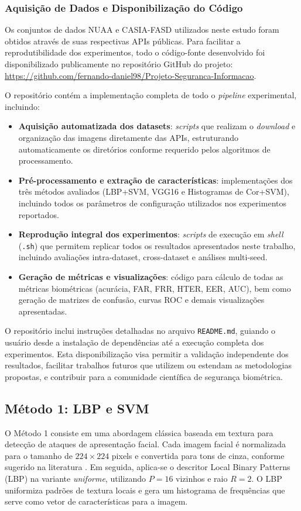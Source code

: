\documentclass[
	article,			%
	11pt,				%
	oneside,			%
	a4paper,			%
	english,			%
	brazil,				%
	sumario=tradicional
	]{abntex2}
\begin{document}
\subsubsection{Aquisição de Dados e Disponibilização do Código}

Os conjuntos de dados NUAA e CASIA-FASD utilizados neste estudo foram obtidos através de suas respectivas APIs públicas. Para facilitar a reprodutibilidade dos experimentos, todo o código-fonte desenvolvido foi disponibilizado publicamente no repositório GitHub do projeto: \url{https://github.com/fernando-daniel98/Projeto-Seguranca-Informacao}.

O repositório contém a implementação completa de todo o \textit{pipeline} experimental, incluindo:

\begin{itemize}
  \item \textbf{Aquisição automatizada dos datasets}: \textit{scripts} que realizam o \textit{download} e organização das imagens diretamente das APIs, estruturando automaticamente os diretórios conforme requerido pelos algoritmos de processamento.
  \item \textbf{Pré-processamento e extração de características}: implementações dos três métodos avaliados (LBP+SVM, VGG16 e Histogramas de Cor+SVM), incluindo todos os parâmetros de configuração utilizados nos experimentos reportados.
  \item \textbf{Reprodução integral dos experimentos}: \textit{scripts} de execução em \textit{shell} (\texttt{.sh}) que permitem replicar todos os resultados apresentados neste trabalho, incluindo avaliações intra-dataset, cross-dataset e análises multi-seed.
  \item \textbf{Geração de métricas e visualizações}: código para cálculo de todas as métricas biométricas (acurácia, FAR, FRR, HTER, EER, AUC), bem como geração de matrizes de confusão, curvas ROC e demais visualizações apresentadas.
\end{itemize}

O repositório inclui instruções detalhadas no arquivo \texttt{README.md}, guiando o usuário desde a instalação de dependências até a execução completa dos experimentos. Esta disponibilização visa permitir a validação independente dos resultados, facilitar trabalhos futuros que utilizem ou estendam as metodologias propostas, e contribuir para a comunidade científica de segurança biométrica.


\subsection{Método 1: LBP e SVM}
O Método 1 consiste em uma abordagem clássica baseada em textura para detecção de ataques de apresentação facial. Cada imagem facial é normalizada para o tamanho de $224\times224$ pixels e convertida para tons de cinza, conforme sugerido na literatura \cite{Kusuma2019_ImageSpoofing}. Em seguida, aplica-se o descritor Local Binary Patterns (LBP) na variante \emph{uniforme}, utilizando $P=16$ vizinhos e raio $R=2$. O LBP uniformiza padrões de textura locais e gera um histograma de frequências que serve como vetor de características para a imagem.
\end{document}
